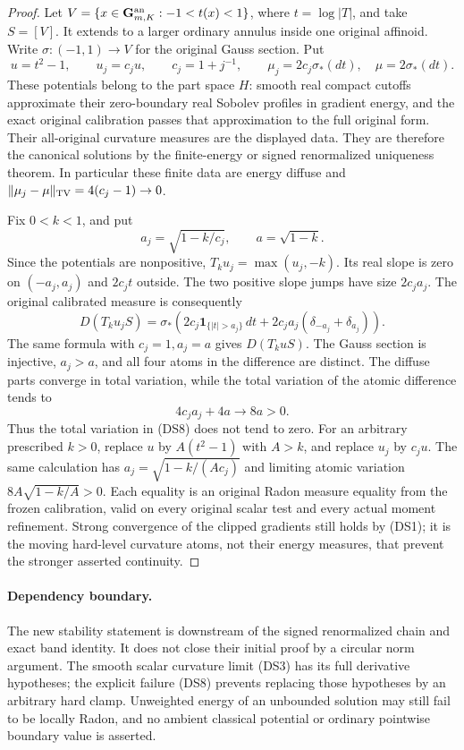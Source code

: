 \begin{proof}
Let $V=\{x\in\mathbf G_{m,K}^{\rm an}:-1<t(x)<1\}$,
where $t=\log|T|$, and take $S=[V]$.  It extends to a larger
ordinary annulus inside one original affinoid.  Write
$\sigma:(-1,1)\to V$ for the original Gauss section.  Put
\[
 u=t^2-1,\qquad u_j=c_j u,\qquad c_j=1+j^{-1},
 \qquad \mu_j=2c_j\sigma_*(dt),\quad\mu=2\sigma_*(dt).
 \tag{DS9}
\]
These potentials belong to the part space $H$: smooth real
compact cutoffs approximate their zero-boundary real Sobolev
profiles in gradient energy, and the exact original calibration
passes that approximation to the full original form.  Their
all-original curvature measures are the displayed data.
They are therefore the canonical solutions by the finite-energy
or signed renormalized uniqueness theorem.  In particular these
finite data are energy diffuse and
$\|\mu_j-\mu\|_{\rm TV}=4(c_j-1)\to0$.

Fix $0<k<1$, and put
\[
                  a_j=\sqrt{1-k/c_j},\qquad a=\sqrt{1-k}.
\]
Since the potentials are nonpositive, $T_ku_j=\max(u_j,-k)$.
Its real slope is zero on $(-a_j,a_j)$ and $2c_jt$ outside.
The two positive slope jumps have size $2c_ja_j$.  The
original calibrated measure is consequently
\[
 D(T_ku_jS)
  =\sigma_*\left(2c_j\mathbf1_{\{|t|>a_j\}}\,dt
                +2c_ja_j(\delta_{-a_j}+\delta_{a_j})\right).
 \tag{DS10}
\]
The same formula with $c_j=1,a_j=a$ gives $D(T_kuS)$.
The Gauss section is injective, $a_j>a$, and all four atoms
in the difference are distinct.  The diffuse parts converge
in total variation, while the total variation of the atomic
difference tends to
\[
                         4c_ja_j+4a\longrightarrow8a>0.
 \tag{DS11}
\]
Thus the total variation in (DS8) does not tend to zero.
For an arbitrary prescribed $k>0$, replace $u$ by
$A(t^2-1)$ with $A>k$, and replace $u_j$ by $c_j u$.
The same calculation has $a_j=\sqrt{1-k/(Ac_j)}$ and
limiting atomic variation $8A\sqrt{1-k/A}>0$.
Each equality is an original Radon measure equality from the
frozen calibration, valid on every original scalar test and
every actual moment refinement.  Strong convergence of the
clipped gradients still holds by (DS1); it is the moving
hard-level curvature atoms, not their energy measures, that
prevent the stronger asserted continuity.
\end{proof}

\paragraph{Dependency boundary.}
The new stability statement is downstream of the signed
renormalized chain and exact band identity.  It does not close
their initial proof by a circular norm argument.  The smooth
scalar curvature limit (DS3) has its full derivative hypotheses;
the explicit failure (DS8) prevents replacing those hypotheses
by an arbitrary hard clamp.  Unweighted energy of an unbounded
solution may still fail to be locally Radon, and no ambient
classical potential or ordinary pointwise boundary value is
asserted.
